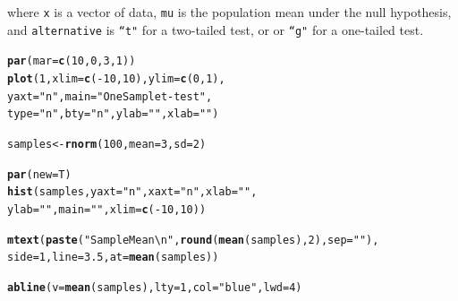 \documentclass{tufte-book}\usepackage[]{graphicx}\usepackage[]{color}
\makeatletter
\newcommand{\hlnum}[1]{\textcolor[rgb]{0.686,0.059,0.569}{#1}}%
\newcommand{\hlstr}[1]{\textcolor[rgb]{0.192,0.494,0.8}{#1}}%
\newcommand{\hlopt}[1]{\textcolor[rgb]{0,0,0}{#1}}%
\newcommand{\hlstd}[1]{\textcolor[rgb]{0.345,0.345,0.345}{#1}}%
\newcommand{\hlkwb}[1]{\textcolor[rgb]{0.69,0.353,0.396}{#1}}%
\newcommand{\hlkwc}[1]{\textcolor[rgb]{0.333,0.667,0.333}{#1}}%
\newcommand{\hlkwd}[1]{\textcolor[rgb]{0.737,0.353,0.396}{\textbf{#1}}}%
\newenvironment{kframe}{%
 \def\at@end@of@kframe{}%
 \ifinner\ifhmode%
  \def\at@end@of@kframe{\end{minipage}}%
  \begin{minipage}{\columnwidth}%
 \fi\fi%
 \def\FrameCommand##1{\hskip\@totalleftmargin \hskip-\fboxsep
 \colorbox{shadecolor}{##1}\hskip-\fboxsep
     \hskip-\linewidth \hskip-\@totalleftmargin \hskip\columnwidth}%
 \MakeFramed {\advance\hsize-\width
   \@totalleftmargin\z@ \linewidth\hsize
   \@setminipage}}%
 {\par\unskip\endMakeFramed%
 \at@end@of@kframe}
\newenvironment{knitrout}{}{} %
\makeatother
\begin{document}
where \texttt{x} is a vector of data, \texttt{mu} is the population mean under the null hypothesis, and \texttt{alternative} is \texttt{``t"} for a two-tailed test, or  or \texttt{``g"} for a one-tailed test.

\begin{marginfigure}
\begin{tiny}
\begin{knitrout}
\color{fgcolor}\begin{kframe}
\begin{alltt}
\hlkwd{par}\hlstd{(}\hlkwc{mar} \hlstd{=} \hlkwd{c}\hlstd{(}\hlnum{10}\hlstd{,} \hlnum{0}\hlstd{,} \hlnum{3}\hlstd{,} \hlnum{1}\hlstd{))}
\hlkwd{plot}\hlstd{(}\hlnum{1}\hlstd{,} \hlkwc{xlim} \hlstd{=} \hlkwd{c}\hlstd{(}\hlopt{-}\hlnum{10}\hlstd{,} \hlnum{10}\hlstd{),} \hlkwc{ylim} \hlstd{=} \hlkwd{c}\hlstd{(}\hlnum{0}\hlstd{,} \hlnum{1}\hlstd{),}
     \hlkwc{yaxt} \hlstd{=} \hlstr{"n"}\hlstd{,} \hlkwc{main} \hlstd{=} \hlstr{"One Sample t-test"}\hlstd{,}
     \hlkwc{type} \hlstd{=} \hlstr{"n"}\hlstd{,} \hlkwc{bty} \hlstd{=} \hlstr{"n"}\hlstd{,} \hlkwc{ylab} \hlstd{=} \hlstr{""}\hlstd{,} \hlkwc{xlab} \hlstd{=} \hlstr{""}\hlstd{)}

\hlstd{samples} \hlkwb{<-} \hlkwd{rnorm}\hlstd{(}\hlnum{100}\hlstd{,} \hlkwc{mean} \hlstd{=} \hlnum{3}\hlstd{,} \hlkwc{sd} \hlstd{=} \hlnum{2}\hlstd{)}

\hlkwd{par}\hlstd{(}\hlkwc{new} \hlstd{= T)}
\hlkwd{hist}\hlstd{(samples,} \hlkwc{yaxt} \hlstd{=} \hlstr{"n"}\hlstd{,} \hlkwc{xaxt} \hlstd{=} \hlstr{"n"}\hlstd{,} \hlkwc{xlab} \hlstd{=} \hlstr{""}\hlstd{,}
     \hlkwc{ylab} \hlstd{=} \hlstr{""}\hlstd{,} \hlkwc{main} \hlstd{=} \hlstr{""}\hlstd{,} \hlkwc{xlim} \hlstd{=} \hlkwd{c}\hlstd{(}\hlopt{-}\hlnum{10}\hlstd{,} \hlnum{10}\hlstd{))}

\hlkwd{mtext}\hlstd{(}\hlkwd{paste}\hlstd{(}\hlstr{"Sample Mean\textbackslash{}n"}\hlstd{,} \hlkwd{round}\hlstd{(}\hlkwd{mean}\hlstd{(samples),} \hlnum{2}\hlstd{),} \hlkwc{sep} \hlstd{=} \hlstr{""}\hlstd{),}
      \hlkwc{side} \hlstd{=} \hlnum{1}\hlstd{,} \hlkwc{line} \hlstd{=} \hlnum{3.5}\hlstd{,} \hlkwc{at} \hlstd{=} \hlkwd{mean}\hlstd{(samples))}

\hlkwd{abline}\hlstd{(}\hlkwc{v} \hlstd{=} \hlkwd{mean}\hlstd{(samples),} \hlkwc{lty} \hlstd{=} \hlnum{1}\hlstd{,} \hlkwc{col} \hlstd{=} \hlstr{"blue"}\hlstd{,} \hlkwc{lwd} \hlstd{=} \hlnum{4}\hlstd{)}


\end{alltt}
\end{kframe}
\end{knitrout}
\end{tiny}
\end{marginfigure}
\end{document}
